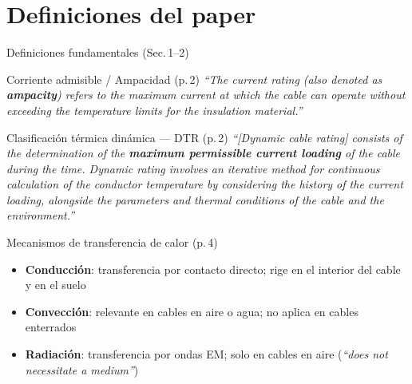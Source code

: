 \documentclass[aspectratio=169]{beamer}
\begin{document}
\section{Definiciones del paper}

\begin{frame}{Definiciones fundamentales (Sec.\,1--2)}
  \begin{block}{Corriente admisible / Ampacidad (p.\,2)}
    \small
    \textit{``The current rating (also denoted as \textbf{ampacity}) refers to the
    maximum current at which the cable can operate without exceeding the
    temperature limits for the insulation material.''}
  \end{block}
  \vspace{0.15em}
  \begin{block}{Clasificación térmica dinámica --- DTR (p.\,2)}
    \small
    \textit{``[Dynamic cable rating] consists of the determination of the
    \textbf{maximum permissible current loading} of the cable during the time.
    Dynamic rating involves an iterative method for continuous calculation of
    the conductor temperature by considering the history of the current loading,
    alongside the parameters and thermal conditions of the cable and the
    environment.''}
  \end{block}
  \vspace{0.1em}
  \begin{exampleblock}{Mecanismos de transferencia de calor (p.\,4)}
    \footnotesize
    \begin{itemize}
      \item \textbf{Conducción}: transferencia por contacto directo; rige en el interior del cable y en el suelo
      \item \textbf{Convección}: relevante en cables en aire o agua; no aplica en cables enterrados
      \item \textbf{Radiación}: transferencia por ondas EM; solo en cables en aire (\textit{``does not necessitate a medium''})
    \end{itemize}
  \end{exampleblock}
\end{frame}
\end{document}
